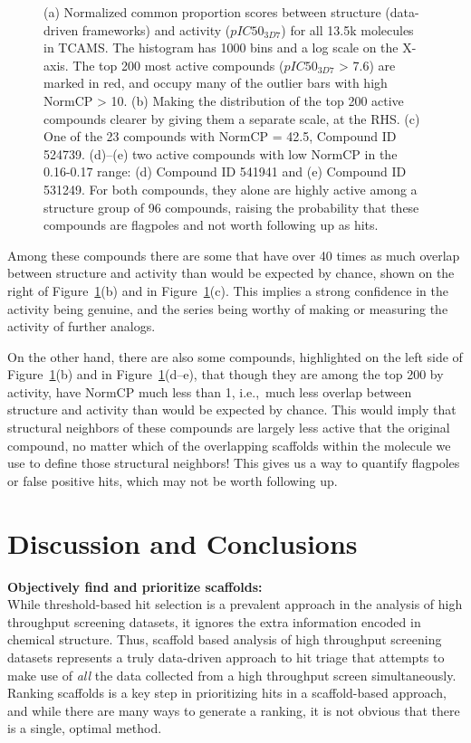 \documentclass[journal=jacsat,biochem,manuscript=article]{achemso}
\newcommand*\fref[1]{Figure~\ref{fig:#1}}
\newcommand*\ie{i.e.,~}
\begin{document}
\begin{figure}
  \caption{(a) Normalized common proportion scores between structure (data-driven frameworks) and activity ($pIC50_{3D7}$) for all 13.5k molecules in TCAMS.  The histogram has 1000 bins and a log scale on the X-axis. The top 200 most active compounds ($pIC50_{3D7}$ > 7.6) are marked in red, and occupy many of the outlier bars with high NormCP > 10. (b) Making the distribution of the top 200 active compounds clearer by giving them a separate scale, at the RHS. (c) One of the 23 compounds with NormCP = 42.5, Compound ID 524739. (d)--(e) two active compounds with low NormCP in the 0.16-0.17 range: (d) Compound ID 541941 and (e) Compound ID 531249. For both compounds, they alone are highly active among a structure group of 96 compounds, raising the probability that these compounds are flagpoles and not worth following up as hits.}
\label{fig:NormCP}   
\end{figure}

Among these compounds there are some that have over 40 times as much overlap between structure and activity than would be expected by chance, shown on the right of \fref{NormCP}(b) and in \fref{NormCP}(c).  This implies a strong confidence in the activity being genuine, and the series being worthy of making or measuring the activity of further analogs.

On the other hand, there are also some compounds, highlighted on the left side of \fref{NormCP}(b) and in \fref{NormCP}(d--e), that though they are among the top 200 by activity, have NormCP much less than 1, \ie much less overlap between structure and activity than would be expected by chance.  This would imply that structural neighbors of these compounds are largely less active that the original compound, no matter which of the overlapping scaffolds within the molecule we use to define those structural neighbors!  This gives us a way to quantify flagpoles or false positive hits, which may not be worth following up.

\section{Discussion and Conclusions}
\label{sec:discussion}

{\bf Objectively find and prioritize scaffolds:}\\
While threshold-based hit selection is a prevalent approach in the
analysis of high throughput screening datasets, it
ignores the extra information encoded in chemical structure. Thus,
scaffold based analysis of high throughput screening datasets
represents a truly data-driven approach to hit triage that attempts to
make use of \emph{all} the data collected from a high throughput
screen simultaneously. Ranking scaffolds is a key step in prioritizing hits in a
scaffold-based approach, and while there are many ways to generate a
ranking, it is not obvious that there is a single, optimal method.
\end{document}
